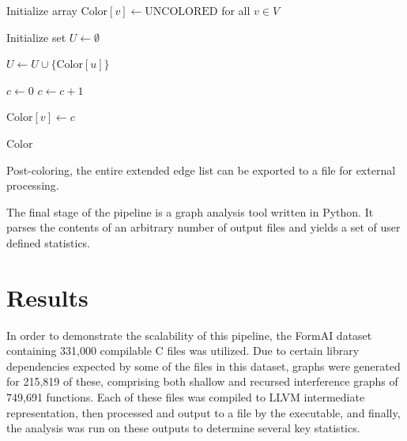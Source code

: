 \documentclass{article}
\begin{document}
\begin{algorithm}[H]
\caption{\textsc{GreedyColor}}
\label{alg:greedy-color}
\begin{algorithmic}[1]

    \State Initialize array $\text{Color}[v] \gets \text{UNCOLORED}$ for all $v \in V$

        \State Initialize set $U \gets \emptyset$      

                \State $U \gets U \cup \{\text{Color}[u]\}$
            \EndIf
        \EndFor

        \State $c \gets 0$
            \State $c \gets c + 1$
        \EndWhile

        \State $\text{Color}[v] \gets c$     
    \EndFor

    \State \Return Color
\EndProcedure

\end{algorithmic}
\end{algorithm}

Post-coloring, the entire extended edge list can be exported to a file for external processing.

The final stage of the pipeline is a graph analysis tool written in Python. It parses the contents of an arbitrary number of output files and yields a set of user defined statistics.

\section{Results}

In order to demonstrate the scalability of this pipeline, the FormAI dataset containing 331,000 compilable C files was utilized. Due to certain library dependencies expected by some of the files in this dataset, graphs were generated for 215,819 of these, comprising both shallow and recursed interference graphs of 749,691 functions. Each of these files was compiled to LLVM intermediate representation, then processed and output to a file by the executable, and finally, the analysis was run on these outputs to determine several key statistics. 
\end{document}
